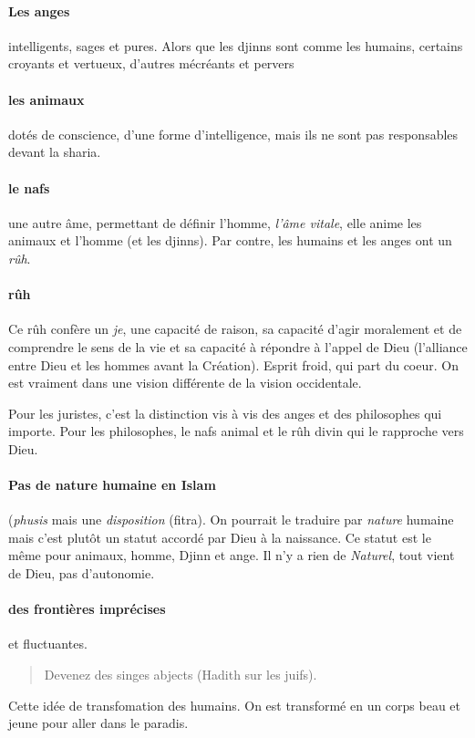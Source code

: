 \paragraph{Les anges} intelligents, sages et pures. Alors que les djinns sont comme les humains, certains croyants et vertueux, d'autres mécréants et pervers

\paragraph{les animaux} dotés de conscience, d'une forme d'intelligence, mais ils ne sont pas responsables devant la sharia. 

\paragraph{le nafs} une autre âme, permettant de définir l'homme, \textit{l'âme vitale}, elle anime les animaux et l'homme (et les djinns). Par contre, les humains et les anges ont un \textit{rûh}.  

\paragraph{rûh} Ce rûh confère un \textit{je}, une capacité de raison, sa capacité d'agir moralement et de comprendre le sens de la vie et sa capacité à répondre à l'appel de Dieu (l'alliance entre Dieu et les hommes avant la Création). Esprit froid,  qui part du coeur. On est vraiment dans une vision différente de la vision occidentale.


Pour les juristes, c'est la distinction vis à vis des anges et des philosophes qui importe. Pour les philosophes, le nafs animal et le rûh divin qui le rapproche vers Dieu.

\paragraph{Pas de nature humaine en Islam } (\textit{phusis} mais une \textit{disposition} (fitra). On pourrait le traduire par \textit{nature} humaine mais c'est plutôt un statut accordé par Dieu à la naissance. Ce statut est le même pour animaux, homme, Djinn et ange. Il n'y a rien de \textit{Naturel}, tout vient de Dieu, pas d'autonomie.

\paragraph{des frontières imprécises} et fluctuantes. 
\begin{quote}
Devenez des singes abjects (Hadith sur les juifs).
\end{quote}
Cette idée de transfomation des humains.
On est transformé en un corps beau et jeune pour aller dans le paradis.

